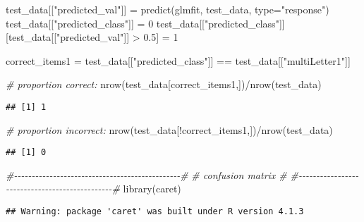 \documentclass[
]{article}
\newenvironment{Shaded}{\begin{snugshade}}{\end{snugshade}}
\newcommand{\AttributeTok}[1]{\textcolor[rgb]{0.77,0.63,0.00}{#1}}
\newcommand{\CommentTok}[1]{\textcolor[rgb]{0.56,0.35,0.01}{\textit{#1}}}
\newcommand{\DecValTok}[1]{\textcolor[rgb]{0.00,0.00,0.81}{#1}}
\newcommand{\FloatTok}[1]{\textcolor[rgb]{0.00,0.00,0.81}{#1}}
\newcommand{\FunctionTok}[1]{\textcolor[rgb]{0.00,0.00,0.00}{#1}}
\newcommand{\NormalTok}[1]{#1}
\newcommand{\OtherTok}[1]{\textcolor[rgb]{0.56,0.35,0.01}{#1}}
\newcommand{\SpecialCharTok}[1]{\textcolor[rgb]{0.00,0.00,0.00}{#1}}
\newcommand{\StringTok}[1]{\textcolor[rgb]{0.31,0.60,0.02}{#1}}
\begin{document}
\begin{Shaded}
\begin{Highlighting}[]
\NormalTok{test\_data[[}\StringTok{"predicted\_val"}\NormalTok{]] }\OtherTok{=} \FunctionTok{predict}\NormalTok{(glmfit, test\_data, }\AttributeTok{type=}\StringTok{"response"}\NormalTok{)}
\NormalTok{test\_data[[}\StringTok{"predicted\_class"}\NormalTok{]] }\OtherTok{=} \DecValTok{0}
\NormalTok{test\_data[[}\StringTok{"predicted\_class"}\NormalTok{]][test\_data[[}\StringTok{"predicted\_val"}\NormalTok{]] }\SpecialCharTok{\textgreater{}} \FloatTok{0.5}\NormalTok{] }\OtherTok{=} \DecValTok{1}

\NormalTok{correct\_items1 }\OtherTok{=}\NormalTok{ test\_data[[}\StringTok{"predicted\_class"}\NormalTok{]] }\SpecialCharTok{==}\NormalTok{ test\_data[[}\StringTok{"multiLetter1"}\NormalTok{]] }

\CommentTok{\# proportion correct:}
\FunctionTok{nrow}\NormalTok{(test\_data[correct\_items1,])}\SpecialCharTok{/}\FunctionTok{nrow}\NormalTok{(test\_data)}
\end{Highlighting}
\end{Shaded}

\begin{verbatim}
## [1] 1
\end{verbatim}

\begin{Shaded}
\begin{Highlighting}[]
\CommentTok{\# proportion incorrect:}
\FunctionTok{nrow}\NormalTok{(test\_data[}\SpecialCharTok{!}\NormalTok{correct\_items1,])}\SpecialCharTok{/}\FunctionTok{nrow}\NormalTok{(test\_data)}
\end{Highlighting}
\end{Shaded}

\begin{verbatim}
## [1] 0
\end{verbatim}

\begin{Shaded}
\begin{Highlighting}[]
\CommentTok{\#{-}{-}{-}{-}{-}{-}{-}{-}{-}{-}{-}{-}{-}{-}{-}{-}{-}{-}{-}{-}{-}{-}{-}{-}{-}{-}{-}{-}{-}{-}{-}{-}{-}{-}{-}{-}{-}{-}{-}{-}{-}{-}{-}{-}{-}{-}{-}\#}
\CommentTok{\#              confusion matrix                 \#}
\CommentTok{\#{-}{-}{-}{-}{-}{-}{-}{-}{-}{-}{-}{-}{-}{-}{-}{-}{-}{-}{-}{-}{-}{-}{-}{-}{-}{-}{-}{-}{-}{-}{-}{-}{-}{-}{-}{-}{-}{-}{-}{-}{-}{-}{-}{-}{-}{-}{-}\#}
\FunctionTok{library}\NormalTok{(caret)}
\end{Highlighting}
\end{Shaded}

\begin{verbatim}
## Warning: package 'caret' was built under R version 4.1.3
\end{verbatim}
\end{document}
